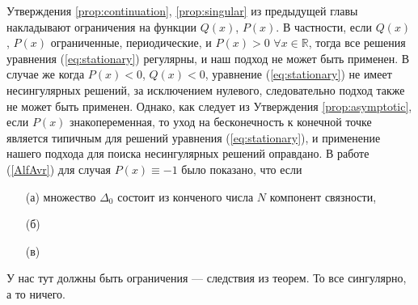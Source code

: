 Утверждения \ref{prop:continuation}, \ref{prop:singular} из предыдущей главы накладывают ограничения на функции $Q(x)$, $P(x)$.
В частности, если $Q(x)$, $P(x)$ ограниченные, периодические, и $P(x) > 0$ $\forall x \in \mathbb{R}$, тогда все решения уравнения (\ref{eq:stationary}) регулярны, и наш подход не может быть применен.
В случае же когда $P(x) < 0$, $Q(x) < 0$, уравнение (\ref{eq:stationary}) не имеет несингулярных решений, за исключением нулевого, следовательно подход также не может быть применен.
Однако, как следует из Утверждения \ref{prop:asymptotic}, если $P(x)$ знакопеременная, то уход на бесконечность к конечной точке является типичным для решений уравнения (\ref{eq:stationary}), и применение нашего подхода для поиска несингулярных решений оправдано.
В работе (\ref{AlfAvr}) для случая $P(x) \equiv -1$ было показано, что если
%
\begin{itemize}
\item[(а)] множество $\Delta_0$ состоит из конченого числа $N$ компонент связности, $$
\item[(б)]
\item[(в)]
\end{itemize}
%

У нас тут должны быть ограничения --- следствия из теорем. То все сингулярно, а то ничего.